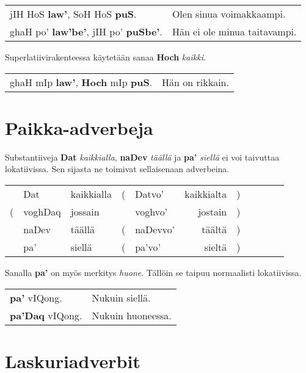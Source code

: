 \documentclass{book}
\begin{document}
\begin{tabular}{l l}
    jIH HoS \textbf{law'}, SoH HoS \textbf{puS}. & Olen sinua voimakkaampi. \\
    ghaH po' \textbf{law'be'}, jIH po' \textbf{puSbe'}. & Hän ei ole minua taitavampi. \\
\end{tabular}

Superlatiivirakenteessa käytetään sanaa \textbf{Hoch} \textit{kaikki}.

\begin{tabular}{l l}
    ghaH mIp \textbf{law'}, \textbf{Hoch} mIp \textbf{puS}. & Hän on rikkain. \\
\end{tabular}

\section{Paikka-adverbeja}

Substantiiveja \textbf{Dat} \textit{kaikkialla}, \textbf{naDev} \textit{täällä} ja \textbf{pa'} \textit{siellä} ei voi taivuttaa lokatiivissa.
Sen sijasta ne toimivat sellaisenaan adverbeina.

\begin{tabular}{r Bl Il | r Bl Il l}
    & Dat & kaikkialla & ( & Datvo' & kaikkialta & ) \\
    ( & voghDaq & jossain & & voghvo' & jostain & ) \\
    & naDev & täällä & ( & naDevvo' & täältä & ) \\
    & pa' & siellä & ( & pa'vo' & sieltä & ) \\
\end{tabular}

Sanalla \textbf{pa'} on myös merkitys \textit{huone}.
Tällöin se taipuu normaalisti lokatiivissa.

\begin{tabular}{l l}
    \textbf{pa'} vIQong. & Nukuin siellä. \\
    \textbf{pa'Daq} vIQong. & Nukuin huoneessa. \\
\end{tabular}

\section{Laskuriadverbit}
\end{document}
